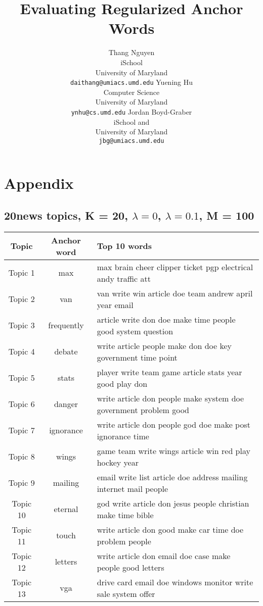 \documentclass{article}
\title{Evaluating Regularized Anchor Words}
\author{
Thang Nguyen\\
iSchool\\
University of Maryland\\
\texttt{daithang@umiacs.umd.edu}
\And
Yuening Hu\\
Computer Science\\
University of Maryland\\
\texttt{ynhu@cs.umd.edu}
\And
Jordan Boyd-Graber \\
iSchool and \abr{umiacs} \\
University of Maryland \\
\texttt{jbg@umiacs.umd.edu}
}
\begin{document}
\maketitle

\section{Appendix}


\subsection{20news topics, K = 20, $\lambda=0$, $\lambda=0.1$, M = 100}
\label{appendix:K20-M100}

\begin{table}[h]
   \begin{center}
  \begin{tabular}{|c|c|l|} \hline
           Topic & Anchor word & Top 10 words \\ \hline
   Topic	1	&	max & max brain cheer clipper ticket pgp electrical andy traffic att	\\ \hline
Topic	2	&	van & van write win article doe team andrew april year email	\\ \hline
Topic	3	&	frequently & article write don doe make time people good system question	\\ \hline
Topic	4	&	debate & write article people make don doe key government time point	\\ \hline
Topic	5	&	stats & player write team game article stats year good play don	\\ \hline
Topic	6	&	danger & write article don people make system doe government problem good	\\ \hline
Topic	7	&	ignorance & write article don people god doe make post ignorance time	\\ \hline
Topic	8	&	wings & game team write wings article win red play hockey year	\\ \hline
Topic	9	&	mailing & email write list article doe address mailing internet mail people	\\ \hline
Topic	10	&	eternal & god write article don jesus people christian make time bible	\\ \hline
Topic	11	&	touch & write article don good make car time doe problem people	\\ \hline
Topic	12	&	letters & write article don email doe case make people good letters	\\ \hline
Topic	13	&	vga & drive card email doe windows monitor write sale system offer	\\ \hline

\end{tabular}
\end{center}
\end{table}
\end{document}
